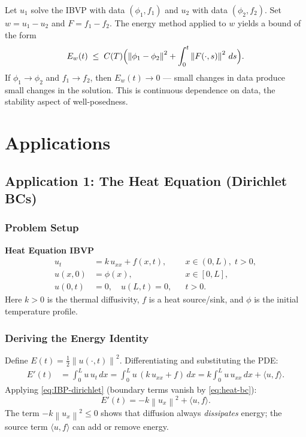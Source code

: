 \documentclass[12pt,a4paper]{article}
\theoremstyle{plain}
\theoremstyle{definition}
\newcommand{\norm}[1]{\left\lVert #1 \right\rVert}
\begin{document}
Let $u_1$ solve the IBVP with data $(\phi_1, f_1)$ and $u_2$ with data $(\phi_2,f_2)$.
Set $w=u_1-u_2$ and $F=f_1-f_2$. The energy method applied to $w$ yields a bound of
the form
\[
  E_w(t) \;\leq\; C(T)\Bigl(\norm{\phi_1-\phi_2}^2 + \int_0^t\norm{F(\cdot,s)}^2\,ds\Bigr).
\]
If $\phi_1\to\phi_2$ and $f_1\to f_2$, then $E_w(t)\to 0$ — small changes in data
produce small changes in the solution. This is continuous dependence on data, the
stability aspect of well-posedness.

\section{Applications}
\label{sec:applications}

\subsection{Application 1: The Heat Equation (Dirichlet BCs)}

\subsubsection*{Problem Setup}

\begin{mdframed}[style=keybox]
\textbf{Heat Equation IBVP}
\begin{align}
  u_t &= k\,u_{xx} + f(x,t), && x\in(0,L),\; t>0, \label{eq:heat-pde}\\
  u(x,0) &= \phi(x), && x\in[0,L], \label{eq:heat-ic}\\
  u(0,t) &= 0,\quad u(L,t)=0, && t>0. \label{eq:heat-bc}
\end{align}
Here $k>0$ is the thermal diffusivity, $f$ is a heat source/sink, and $\phi$
is the initial temperature profile.
\end{mdframed}

\subsubsection*{Deriving the Energy Identity}

Define $E(t)=\tfrac{1}{2}\norm{u(\cdot,t)}^2$. Differentiating and substituting
the PDE:
\begin{align*}
  E'(t) &= \int_0^L u\,u_t\,dx
          = \int_0^L u\,(k\,u_{xx}+f)\,dx
          = k\int_0^L u\,u_{xx}\,dx + \langle u,f\rangle.
\end{align*}
Applying \eqref{eq:IBP-dirichlet} (boundary terms vanish by \eqref{eq:heat-bc}):
\begin{equation}
  \boxed{E'(t) = -k\norm{u_x}^2 + \langle u,f\rangle.}
  \label{eq:heat-energy}
\end{equation}
The term $-k\norm{u_x}^2\leq 0$ shows that diffusion always \emph{dissipates}
energy; the source term $\langle u,f\rangle$ can add or remove energy.
\end{document}
